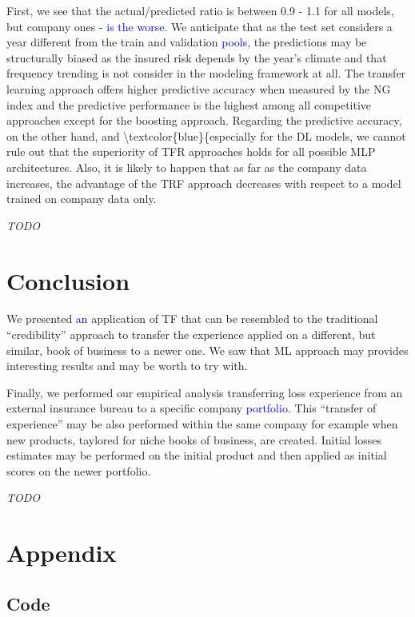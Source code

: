 \documentclass[
]{article}
\begin{document}
First, we see that the actual/predicted ratio is between 0.9 - 1.1 for
all models, but company ones - \textcolor{blue}{is the worse}. We
anticipate that as the test set considers a year different from the
train and validation \textcolor{blue}{pools}, the predictions may be
structurally biased as the insured risk depends by the year's climate
and that frequency trending is not consider in the modeling framework at
all. The transfer learning approach offers higher predictive accuracy
when measured by the NG index and the predictive performance is the
highest among all competitive approaches except for the boosting
approach. Regarding the predictive accuracy, on the other hand, and
\textbackslash textcolor\{blue\}\{especially for the DL models, we
cannot rule out that the superiority of TFR approaches holds for all
possible MLP architectures. Also, it is likely to happen that as far as
the company data increases, the advantage of the TRF approach decreases
with respect to a model trained on company data only.

\emph{TODO}

\hypertarget{conclusion}{%
\section{Conclusion}\label{conclusion}}

We presented \textcolor{blue}{an} application of TF that can be
resembled to the traditional ``credibility'' approach to transfer the
experience applied on a different, but similar, book of business to a
newer one. We saw that ML approach may provides interesting results and
may be worth to try with.

Finally, we performed our empirical analysis transferring loss
experience from an external insurance bureau to a specific company
\textcolor{blue}{portfolio.} This ``transfer of experience'' may be also
performed within the same company for example when new products,
taylored for niche books of business, are created. Initial losses
estimates may be performed on the initial product and then applied as
initial scores on the newer portfolio.

\emph{TODO}

\hypertarget{appendix}{%
\section{Appendix}\label{appendix}}

\hypertarget{code}{%
\subsection{Code}\label{code}}
\end{document}
